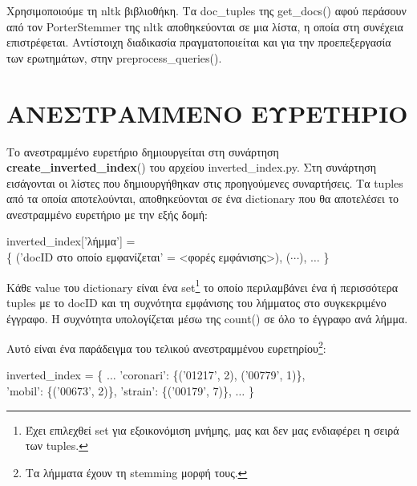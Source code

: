 ﻿\documentclass[12pt]{report}
\begin{document}
            Χρησιμοποιούμε τη {\fontCode\small nltk} βιβλιοθήκη. Τα {\fontCode\small doc\_tuples} της
            {\fontCode\small get\_docs()} αφού περάσουν από τον {\fontCode\small PorterStemmer} της {\fontCode\small nltk} αποθηκεύονται σε μια λίστα,
            η οποία στη συνέχεια επιστρέφεται.\linebreak
            Αντίστοιχη διαδικασία πραγματοποιείται και για την προεπεξεργασία των ερωτημάτων, στην {\fontCode\small preprocess\_queries()}.

        \section{ΑΝΕΣΤΡΑΜΜΕΝΟ ΕΥΡΕΤΗΡΙΟ}

            Το ανεστραμμένο ευρετήριο δημιουργείται στη συνάρτηση {\fontCode\small \textbf{create\_inverted\_index}()} του αρχείου {\fontCode\small inverted\_index.py}.
            Στη συνάρτηση εισάγονται οι λίστες που δημιουργήθηκαν στις προηγούμενες συναρτήσεις. Τα tuples από τα οποία αποτελούνται, αποθηκεύονται σε ένα dictionary που θα αποτελέσει το ανεστραμμένο ευρετήριο με την εξής δομή:

                \begin{graycomment} \centering
                    {\fontCode\footnotesize inverted\_index['λήμμα'] = \\ \{ ('docID στο οποίο εμφανίζεται' = <φορές εμφάνισης>), (\(\cdots\)), \(\ldots\) \}}
                \end{graycomment}

            Κάθε value του dictionary είναι ένα set\footnote{Έχει επιλεχθεί set για εξοικονόμιση μνήμης, μας και δεν μας ενδιαφέρει η σειρά των tuples.} το οποίο περιλαμβάνει ένα ή περισσότερα tuples
            με το {\fontCode\small docID} και τη συχνότητα εμφάνισης του λήμματος στο συγκεκριμένο έγγραφο.
            Η συχνότητα υπολογίζεται μέσω της {\fontCode\small count()} σε όλο το έγγραφο ανά λήμμα.

            Αυτό είναι ένα παράδειγμα του τελικού ανεστραμμένου ευρετηρίου\footnote{Τα λήμματα έχουν τη stemming μορφή τους.}:

                \begin{graycomment} \centering
                    \fontCode\footnotesize inverted\_index = \{ \(\ldots\) 'coronari': \{('01217', 2), ('00779', 1)\}, \\ 'mobil': \{('00673', 2)\}, 'strain': \{('00179', 7)\}, \(\ldots\) \}
                \end{graycomment}
\end{document}
